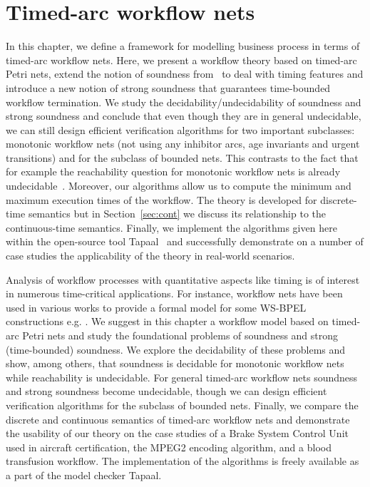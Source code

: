\chapter{Timed-arc workflow nets}\label{chapter:c5}

In this chapter, we define a framework for modelling business process in terms of timed-arc workflow nets. Here, 
we present a workflow theory based on timed-arc Petri nets,
extend the notion of soundness from~\cite{Aalst97} to deal with 
timing features and introduce a new notion of strong soundness
that guarantees time-bounded workflow termination. We study
the decidability/undecidability of soundness and strong soundness
and conclude that even though they are in general undecidable,
we can still design efficient verification algorithms for two important
subclasses: monotonic workflow nets 
(not using any inhibitor arcs, age invariants and urgent transitions)
and for the subclass of bounded nets. 
This contrasts to the fact that for example the reachability
question for monotonic workflow nets is already 
undecidable~\cite{RGE:reachability}. 
Moreover, our algorithms 
allow us to compute the minimum and maximum execution times of the
workflow. The theory is developed for
discrete-time semantics but in Section~\ref{sec:cont} we discuss its
relationship to the continuous-time semantics. Finally, we implement
the algorithms given here within the open-source tool 
Tapaal~\cite{DJJJMS:TACAS:12} and successfully demonstrate on a number of 
case studies the applicability of the theory in real-world scenarios.

Analysis of workflow processes with quantitative aspects
like timing is of interest in numerous time-critical applications. 
For instance, workflow nets have been used in various works to provide a formal
model for some WS-BPEL constructions e.g. \cite{AalstJL05,Ouyang2007,AalstL08,LohmannK08,Lohmann07}.
We suggest in this chapter a workflow model based on timed-arc Petri nets and study
the foundational problems of soundness and strong (time-bounded) soundness.
We explore the decidability of these problems
and show, among others, that soundness is decidable for monotonic 
workflow nets while reachability is undecidable.
For general timed-arc workflow nets soundness and
strong soundness become undecidable, though we can design efficient
verification algorithms for the subclass of bounded nets. 
Finally, we compare the discrete and continuous semantics of timed-arc
workflow nets and demonstrate the usability of our theory on
the case studies of a Brake System Control Unit used in aircraft certification,
the MPEG2 encoding algorithm, and 
a blood transfusion workflow.
The implementation of the algorithms is  
freely available as a part of the model checker Tapaal.


